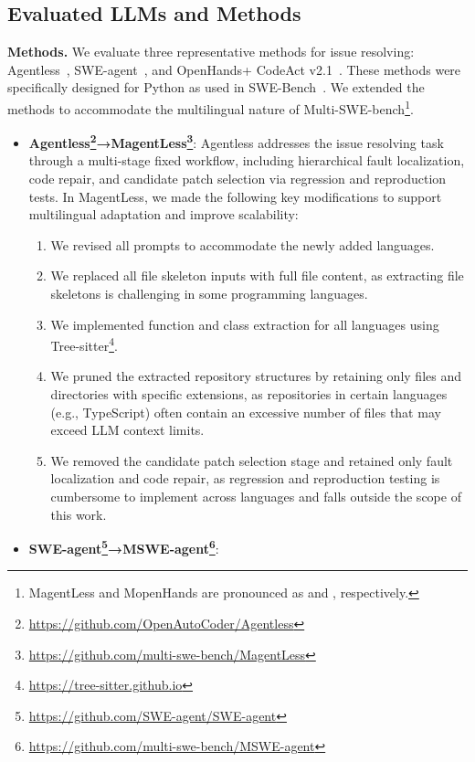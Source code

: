 \documentclass[11pt, a4paper, logo, copyright, nonumbering]{seed}
\newcommand{\multiswebench}{Multi-SWE-bench\xspace}
\newcommand{\agentless}{Agentless\xspace}
\newcommand{\magentless}{MagentLess\xspace}
\newcommand{\sweagent}{SWE-agent\xspace}
\newcommand{\msweagent}{MSWE-agent\xspace}
\newcommand{\openhands}{OpenHands\xspace}
\newcommand{\mopenhands}{MopenHands\xspace}
\begin{document}
\subsection{Evaluated LLMs and Methods}
\noindent\textbf{Methods.}
We evaluate three representative methods for issue resolving: \agentless~\citep{xia2024agentless}, \sweagent~\citep{yang2024sweagent}, and \openhands+ CodeAct v2.1~\citep{openhands}.
These methods were specifically designed for Python as used in SWE-Bench~\citep{swe-bench}.
We extended the methods to accommodate the multilingual nature of \multiswebench\footnote{\magentless and \mopenhands are pronounced as  and , respectively.}.
\begin{itemize}[leftmargin=*]
    \item \textbf{\agentless\footnote{\url{https://github.com/OpenAutoCoder/Agentless}}→\magentless\footnote{\url{https://github.com/multi-swe-bench/MagentLess}}}: 
    \agentless addresses the issue resolving task through a multi-stage fixed workflow, including hierarchical fault localization, code repair, and candidate patch selection via regression and reproduction tests.
    In \magentless, we made the following key modifications to support multilingual adaptation and improve scalability:
    \begin{enumerate}
    \item We revised all prompts to accommodate the newly added languages.
    \item We replaced all file skeleton inputs with full file content, as extracting file skeletons is challenging in some programming languages.
    \item We implemented function and class extraction for all languages using Tree-sitter\footnote{\url{https://tree-sitter.github.io}}.
    \item We pruned the extracted repository structures by retaining only files and directories with specific extensions, as repositories in certain languages (e.g., TypeScript) often contain an excessive number of files that may exceed LLM context limits.
    \item We removed the candidate patch selection stage and retained only fault localization and code repair, as regression and reproduction testing is cumbersome to implement across languages and falls outside the scope of this work.
    \end{enumerate}   
    \item \textbf{\sweagent\footnote{\url{https://github.com/SWE-agent/SWE-agent}}→\msweagent\footnote{\url{https://github.com/multi-swe-bench/MSWE-agent}}}: 

\end{itemize}
\end{document}
